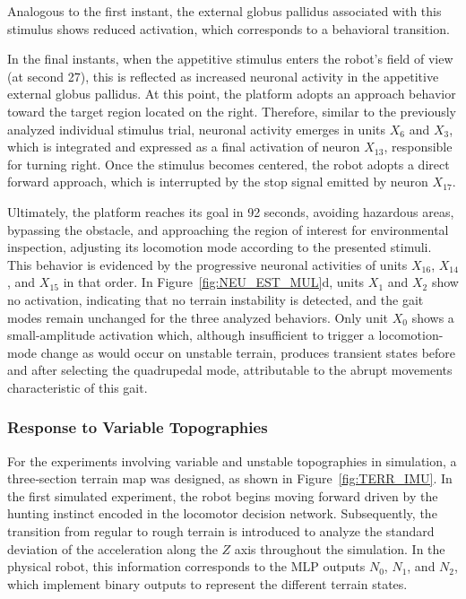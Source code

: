 \documentclass[preprint,12pt]{elsarticle}
\begin{document}
Analogous to the first instant, the external globus pallidus associated with this stimulus shows reduced activation, which corresponds to a behavioral transition. 

In the final instants, when the appetitive stimulus enters the robot’s field of view (at second 27), this is reflected as increased neuronal activity in the appetitive external globus pallidus. At this point, the platform adopts an approach behavior toward the target region located on the right. Therefore, similar to the previously analyzed individual stimulus trial, neuronal activity emerges in units $X_6$ and $X_3$, which is integrated and expressed as a final activation of neuron $X_{13}$, responsible for turning right. Once the stimulus becomes centered, the robot adopts a direct forward approach, which is interrupted by the stop signal emitted by neuron $X_{17}$. 

Ultimately, the platform reaches its goal in 92 seconds, avoiding hazardous areas, bypassing the obstacle, and approaching the region of interest for environmental inspection, adjusting its locomotion mode according to the presented stimuli. This behavior is evidenced by the progressive neuronal activities of units $X_{16}$, $X_{14}$, and $X_{15}$ in that order. In Figure~\ref{fig:NEU_EST_MUL}d, units $X_1$ and $X_2$ show no activation, indicating that no terrain instability is detected, and the gait modes remain unchanged for the three analyzed behaviors. Only unit $X_0$ shows a small-amplitude activation which, although insufficient to trigger a locomotion-mode change as would occur on unstable terrain, produces transient states before and after selecting the quadrupedal mode, attributable to the abrupt movements characteristic of this gait. 

\subsubsection{Response to Variable Topographies}

For the experiments involving variable and unstable topographies in simulation, a three‐section terrain map was designed, as shown in Figure~\ref{fig:TERR_IMU}. In the first simulated experiment, the robot begins moving forward driven by the hunting instinct encoded in the locomotor decision network. Subsequently, the transition from regular to rough terrain is introduced to analyze the standard deviation of the acceleration along the $Z$ axis throughout the simulation. In the physical robot, this information corresponds to the MLP outputs $N_{0}$, $N_{1}$, and $N_{2}$, which implement binary outputs to represent the different terrain states. 
\end{document}
